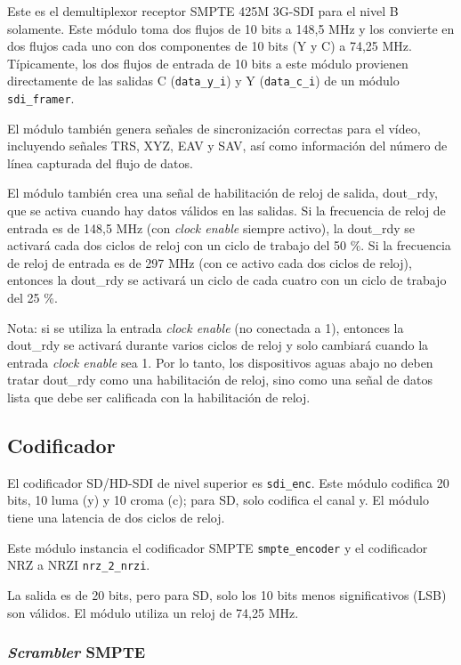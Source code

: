 Este es el demultiplexor receptor SMPTE 425M 3G-SDI para el nivel B solamente.
Este módulo toma dos flujos de 10 bits a 148,5 MHz y los convierte en dos flujos
cada uno con dos componentes de 10 bits (Y y C) a 74,25 MHz. Típicamente, los
dos flujos de entrada de 10 bits a este módulo provienen directamente de las
salidas C (\texttt{data\_y\_i}) y Y (\texttt{data\_c\_i}) de un módulo \texttt{sdi\_framer}.

El módulo también genera señales de sincronización correctas para el vídeo,
incluyendo señales TRS, XYZ, EAV y SAV, así como información del número de
línea capturada del flujo de datos.

El módulo también crea una señal de habilitación de reloj de salida, dout\_rdy,
que se activa cuando hay datos válidos en las salidas. Si la frecuencia de reloj
de entrada es de 148,5 MHz (con \textit{clock enable} siempre activo), la dout\_rdy se activará cada
dos ciclos de reloj con un ciclo de trabajo del 50 \%. Si la frecuencia de reloj
de entrada es de 297 MHz (con ce activo cada dos ciclos de reloj), entonces la
dout\_rdy se activará un ciclo de cada cuatro con un ciclo de trabajo del 25 \%.

Nota: si se utiliza la entrada \textit{clock enable} (no conectada a 1), entonces la dout\_rdy se
activará durante varios ciclos de reloj y solo cambiará cuando la entrada \textit{clock enable}
sea 1. Por lo tanto, los dispositivos aguas abajo no deben tratar dout\_rdy
como una habilitación de reloj, sino como una señal de datos lista que debe
ser calificada con la habilitación de reloj.

\subsection{Codificador}

El codificador SD/HD-SDI de nivel superior es \texttt{sdi\_enc}. Este módulo codifica
20 bits, 10 luma (y) y 10 croma (c); para SD, solo codifica el canal y. El
módulo tiene una latencia de dos ciclos de reloj.

Este módulo instancia el codificador SMPTE \texttt{smpte\_encoder} y el codificador
NRZ a NRZI \texttt{nrz\_2\_nrzi}.

La salida es de 20 bits, pero para SD, solo los 10 bits menos significativos
(LSB) son válidos. El módulo utiliza un reloj de 74,25 MHz.

\subsubsection{\textit{Scrambler} SMPTE}

